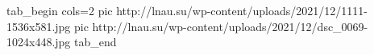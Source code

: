  
 
 
 
 


\ifcmt
  tab_begin cols=2
     pic http://lnau.su/wp-content/uploads/2021/12/1111-1536x581.jpg
     pic http://lnau.su/wp-content/uploads/2021/12/dsc_0069-1024x448.jpg
  tab_end
\fi
